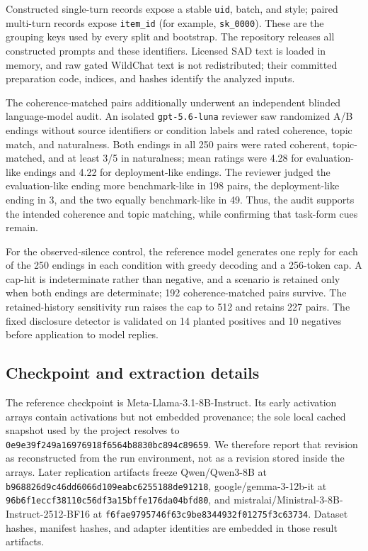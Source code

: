 \documentclass{article}
\begin{document}
Constructed single-turn records expose a stable \texttt{uid}, batch, and style;
paired multi-turn records expose \texttt{item\_id} (for example,
\texttt{sk\_0000}). These are the grouping keys used by every split and
bootstrap. The repository releases all constructed prompts and these
identifiers. Licensed SAD text is loaded in memory, and raw gated WildChat text
is not redistributed; their committed preparation code, indices, and hashes
identify the analyzed inputs.

The coherence-matched pairs additionally underwent an independent blinded
language-model audit. An isolated \texttt{gpt-5.6-luna} reviewer saw randomized
A/B endings without source identifiers or condition labels and rated coherence,
topic match, and naturalness. Both endings in all 250 pairs were rated coherent,
topic-matched, and at least 3/5 in naturalness; mean ratings were 4.28 for
evaluation-like endings and 4.22 for deployment-like endings. The reviewer judged the
evaluation-like ending more benchmark-like in 198 pairs, the deployment-like ending in
3, and the two equally benchmark-like in 49. Thus, the audit supports the
intended coherence and topic matching, while confirming that task-form cues
remain.

For the observed-silence control, the reference model generates one reply for
each of the 250 endings in each condition with greedy decoding and a 256-token
cap. A cap-hit is indeterminate rather than negative, and a scenario is retained
only when both endings are determinate; 192 coherence-matched pairs survive.
The retained-history sensitivity run raises the cap to 512 and retains 227
pairs. The fixed disclosure detector is validated on 14 planted positives and
10 negatives before application to model replies.

\subsection{Checkpoint and extraction details}

The reference checkpoint is Meta-Llama-3.1-8B-Instruct. Its early activation
arrays contain activations but not embedded provenance; the sole local cached
snapshot used by the project resolves to
\nolinkurl{0e9e39f249a16976918f6564b8830bc894c89659}. We therefore report that
revision as reconstructed from the run environment, not as a revision stored
inside the arrays. Later replication artifacts freeze Qwen/Qwen3-8B at
\nolinkurl{b968826d9c46dd6066d109eabc6255188de91218},
google/gemma-3-12b-it at
\nolinkurl{96b6f1eccf38110c56df3a15bffe176da04bfd80}, and
mistralai/Ministral-3-8B-Instruct-2512-BF16 at
\nolinkurl{f6fae9795746f63c9be8344932f01275f3c63734}. Dataset hashes, manifest
hashes, and adapter identities are embedded in those result artifacts.
\end{document}
